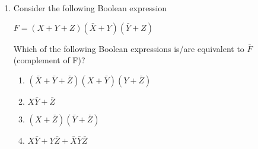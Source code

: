 \documentclass[12pt]{article}                         \usepackage{hyperref}                                 \usepackage{listings}
\date{\today}
\begin{document}
\maketitle{}
\begin{enumerate}
\item Consider the following Boolean expression 

            $F = (X+Y+Z)(\bar{X}+Y)(\bar{Y}+Z)$ 
       
Which of the following Boolean expressions is/are equivalent to $\overline{F}$ (complement of F)?            \begin{enumerate}                                     \item $(\bar{X}+\bar{Y}+\bar{Z})(X+\bar{Y})(Y+\bar{Z})$
\item $X\bar{Y}+\bar{Z}$
\item $(X+\bar{Z})(\bar{Y}+\bar{Z})$
\item $X\bar{Y}+Y\bar{Z}+\bar{X}\bar{Y}\bar{Z}$
\end{enumerate}
\end{enumerate}
\end{document}

